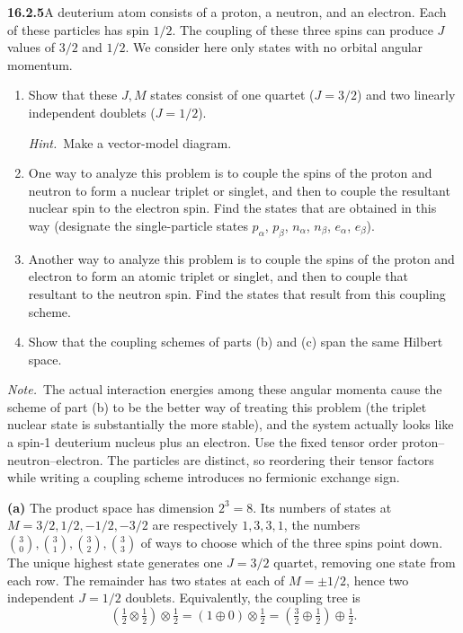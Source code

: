 \par\bigskip
\noindent\textbf{16.2.5}\quad A deuterium atom consists of a proton,
a neutron, and an electron. Each of these particles has spin $1/2$.
The coupling of these three spins can produce $J$ values of $3/2$ and
$1/2$. We consider here only states with no orbital angular momentum.
\begin{enumerate}
\item[(a)] Show that these $J,M$ states consist of one quartet
($J=3/2$) and two linearly independent doublets ($J=1/2$).
\par\emph{Hint.}~Make a vector-model diagram.
\item[(b)] One way to analyze this problem is to couple the spins of
the proton and neutron to form a nuclear triplet or singlet, and then
to couple the resultant nuclear spin to the electron spin. Find the
states that are obtained in this way (designate the single-particle
states $p_{\alpha}$, $p_{\beta}$, $n_{\alpha}$, $n_{\beta}$,
$e_{\alpha}$, $e_{\beta}$).
\item[(c)] Another way to analyze this problem is to couple the spins
of the proton and electron to form an atomic triplet or singlet, and
then to couple that resultant to the neutron spin. Find the states
that result from this coupling scheme.
\item[(d)] Show that the coupling schemes of parts (b) and (c) span
the same Hilbert space.
\end{enumerate}
\par\emph{Note.}~The actual interaction energies among these angular
momenta cause the scheme of part (b) to be the better way of treating
this problem (the triplet nuclear state is substantially the more
stable), and the system actually looks like a spin-1 deuterium
nucleus plus an electron.
\solution
Use the fixed tensor order proton--neutron--electron.
The particles are distinct, so reordering their tensor factors while
writing a coupling scheme introduces no fermionic exchange sign.

\textbf{(a)} The product space has dimension $2^3=8$. Its numbers
of states at $M=3/2,1/2,-1/2,-3/2$ are respectively $1,3,3,1$,
the numbers $\binom30,\binom31,\binom32,\binom33$ of ways to choose
which of the three spins point down.
The unique highest state generates one $J=3/2$ quartet, removing
one state from each row. The remainder has two states at each of
$M=\pm1/2$, hence two independent $J=1/2$ doublets.
Equivalently, the coupling tree is
\[
(\tfrac12\otimes\tfrac12)\otimes\tfrac12
=(1\oplus0)\otimes\tfrac12
=(\tfrac32\oplus\tfrac12)\oplus\tfrac12.
\]

